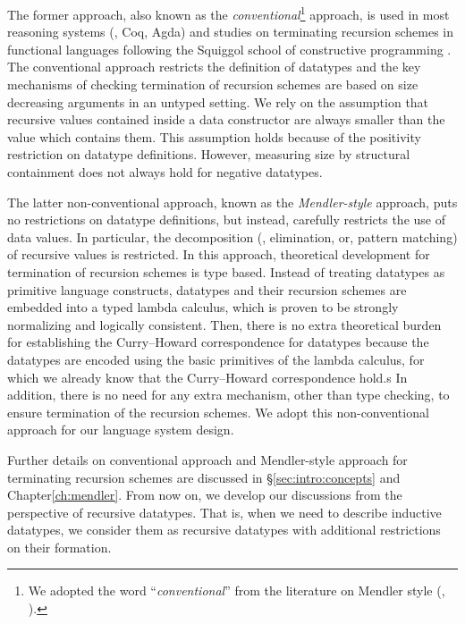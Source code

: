 The former approach, also known as the \emph{conventional}\footnote{
        We adopted the word ``\emph{conventional}'' from the literature
        on Mendler style (\eg, \cite{AbeMat04}).}
approach, is used in most reasoning systems (\eg, Coq, Agda) and studies
on terminating recursion schemes in functional languages following
the Squiggol school of constructive programming \cite{AoP,hagino87phd,Bir87}.
The conventional approach restricts the definition of datatypes and
the key mechanisms of checking termination of recursion schemes are based on
size decreasing arguments in an untyped setting. We rely on the assumption
that recursive values contained inside a data constructor are always
smaller than the value which contains them. This assumption holds because of
the positivity restriction on datatype definitions. However, measuring
size by structural containment does not always hold for negative datatypes.

The latter non-conventional approach, known as the \emph{Mendler-style}
approach, puts no restrictions on datatype definitions, but instead,
carefully restricts the use of data values. In particular, the decomposition
(\ie, elimination, or, pattern matching) of recursive values is restricted.
In this approach, theoretical development for termination of recursion schemes
is type based. Instead of treating datatypes as primitive language constructs,
datatypes and their recursion schemes are embedded into a typed lambda calculus,
which is proven to be strongly normalizing and logically consistent.
Then, there is no extra theoretical burden for establishing
the Curry--Howard correspondence for datatypes because the datatypes are
encoded using the basic primitives of the lambda calculus, for which we already
know that the Curry--Howard correspondence hold.s In addition, there is no need
for any extra mechanism, other than type checking, to ensure termination of
the recursion schemes. We adopt this non-conventional approach for our language
system design.

Further details on conventional approach and Mendler-style approach
for terminating recursion schemes are discussed in \S\ref{sec:intro:concepts}
and Chapter\;\ref{ch:mendler}. From now on, we develop our discussions
from the perspective of recursive datatypes. That is, when we need to describe
inductive datatypes, we consider them as recursive datatypes with additional
restrictions on their formation.

